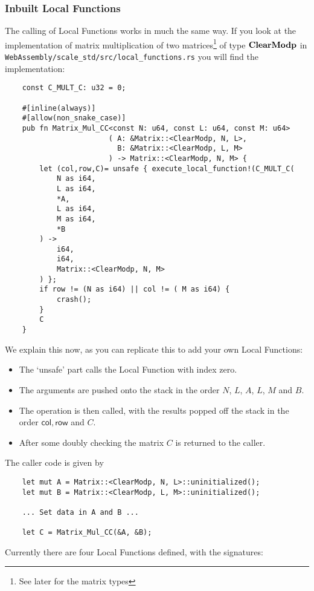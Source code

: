 \subsubsection{Inbuilt Local Functions}
The calling of Local Functions works in much the same way.
If you look at the implementation of matrix multiplication of
two matrices\footnote{See later for the matrix types} 
of type $\mathbf{ClearModp}$ in \verb|WebAssembly/scale_std/src/local_functions.rs|
you will find the implementation:
\begin{lstlisting}
    const C_MULT_C: u32 = 0;

    #[inline(always)]
    #[allow(non_snake_case)]
    pub fn Matrix_Mul_CC<const N: u64, const L: u64, const M: u64>
                        ( A: &Matrix::<ClearModp, N, L>,
                          B: &Matrix::<ClearModp, L, M>
                        ) -> Matrix::<ClearModp, N, M> {
        let (col,row,C)= unsafe { execute_local_function!(C_MULT_C(
            N as i64,
            L as i64,
            *A,
            L as i64,
            M as i64,
            *B
        ) ->
            i64,
            i64,
            Matrix::<ClearModp, N, M>
        ) };
        if row != (N as i64) || col != ( M as i64) {
            crash();
        }
        C
    }
\end{lstlisting}
We explain this now, as you can replicate this to add your own
Local Functions:
\begin{itemize}
\item The `unsafe' part calls the Local Function with index zero.
\item The arguments are pushed onto the stack in the order
$N$, $L$, $A$, $L$, $M$ and $B$.
\item The operation is then called, with the results popped
off the stack in the order $\mathsf{col}, \mathsf{row}$
and $C$.
\item After some doubly checking the matrix $C$ is returned to the 
caller.
\end{itemize}
The caller code is given by
\begin{lstlisting}
    let mut A = Matrix::<ClearModp, N, L>::uninitialized();
    let mut B = Matrix::<ClearModp, L, M>::uninitialized();

    ... Set data in A and B ...

    let C = Matrix_Mul_CC(&A, &B);
\end{lstlisting}
Currently there are four Local Functions defined, with
the signatures:
